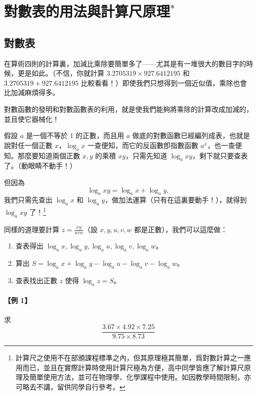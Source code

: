 
\section{對數表的用法與計算尺原理\texorpdfstring{$^*$}{*}}\label{sec:b2_ch5}

\subsection{對數表}

在算術四則的計算裏，加減比乘除要簡單多了——尤其是有一堆很大的數目字的時候，更是如此。（不信，你就計算 $3.2705319 \times 927.6412195$ 和 $3.2705319 + 927.6412195$ 比較看看！）即使我們只想得到一個近似值，乘除也會比加減麻煩得多。

對數函數的發明和對數函數表的利用，就是使我們能夠將乘除的計算改成加減的，並且使它器械化！

假設 $a$ 是一個不等於 1 的正數，而且用 $a$ 做底的對數函數已經編列成表，也就是說對任一個正數 $x$，$\log_a x$ 一查便知，而它的反函數卽指數函數 $a^x$，也一查便知。那麼要知道兩個正數 $x, y$ 的乘積 $xy$，只需先知道 $\log_a xy$，剩下就只要查表了。（動眼睛不動手！）

但因為
\[
\log_a xy = \log_a x + \log_a y,
\]
我們只需先查出 $\log_a x$ 和 $\log_a y$，做加法運算（只有在這裏要動手！），就得到 $\log_a xy$ 了！\footnote{計算尺之使用不在部頒課程標準之內，但其原理極其簡單，爲對數計算之一應用而已，並且在實際計算時使用計算尺極為方便，高中同學皆應了解計算尺原理及簡單使用方法，並可在物理學、化學課程中使用。如因教學時間限制，亦可略去不講，留供同學自行參考。}

同樣的道理要計算 $z = \frac{xy}{uvw}$（設 $x, y, u, v, w$ 都是正數），我們可以這麼做：
\begin{enumerate}[(1)]
    \item 查表得出 $\log_a x, \log_a y, \log_a u, \log_a v, \log_a w$。
    \item 算出 $S = \log_a x + \log_a y - \log_a u - \log_a v - \log_a w$。
    \item 查表找出正數 $z$ 使得 $\log_a z = S$。
\end{enumerate}

\paragraph{【例 1】} 求
\[
\frac{3.67 \times 4.92 \times 7.25}{9.75 \times 8.73}
\]

